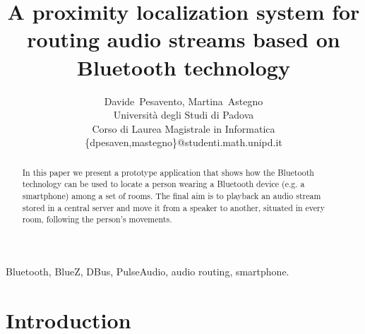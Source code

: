 \documentclass[conference]{IEEEtran}
\begin{document}
\title{A proximity localization system for routing audio streams based on Bluetooth technology}
\author{Davide~Pesavento, Martina~Astegno \\
	Università degli Studi di Padova \\
	Corso di Laurea Magistrale in Informatica \\
	\{dpesaven,mastegno\}@studenti.math.unipd.it
}

\maketitle

\begin{abstract}
In this paper we present a prototype application that shows how the Bluetooth technology can be used to locate a person wearing a Bluetooth device (e.g. a smartphone) among a set of rooms. The final aim is to playback an audio stream stored in a central server and move it from a speaker to another, situated in every room, following the person's movements.
\end{abstract}

\begin{IEEEkeywords} %
Bluetooth, BlueZ, DBus, PulseAudio, audio routing, smartphone.
\end{IEEEkeywords}


%
\IEEEpeerreviewmaketitle



\section{Introduction}
\end{document}
